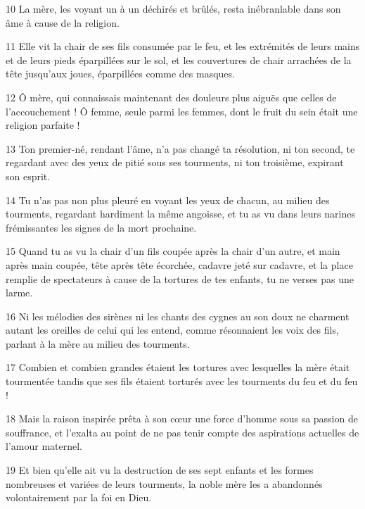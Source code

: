 \par 10 La mère, les voyant un à un déchirés et brûlés, resta inébranlable dans son âme à cause de la religion.

\par 11 Elle vit la chair de ses fils consumée par le feu, et les extrémités de leurs mains et de leurs pieds éparpillées sur le sol, et les couvertures de chair arrachées de la tête jusqu'aux joues, éparpillées comme des masques.

\par 12 Ô mère, qui connaissais maintenant des douleurs plus aiguës que celles de l'accouchement ! Ô femme, seule parmi les femmes, dont le fruit du sein était une religion parfaite !

\par 13 Ton premier-né, rendant l'âme, n'a pas changé ta résolution, ni ton second, te regardant avec des yeux de pitié sous ses tourments, ni ton troisième, expirant son esprit.

\par 14 Tu n'as pas non plus pleuré en voyant les yeux de chacun, au milieu des tourments, regardant hardiment la même angoisse, et tu as vu dans leurs narines frémissantes les signes de la mort prochaine.

\par 15 Quand tu as vu la chair d'un fils coupée après la chair d'un autre, et main après main coupée, tête après tête écorchée, cadavre jeté sur cadavre, et la place remplie de spectateurs à cause de la tortures de tes enfants, tu ne verses pas une larme.

\par 16 Ni les mélodies des sirènes ni les chants des cygnes au son doux ne charment autant les oreilles de celui qui les entend, comme résonnaient les voix des fils, parlant à la mère au milieu des tourments.

\par 17 Combien et combien grandes étaient les tortures avec lesquelles la mère était tourmentée tandis que ses fils étaient torturés avec les tourments du feu et du feu !

\par 18 Mais la raison inspirée prêta à son cœur une force d'homme sous sa passion de souffrance, et l'exalta au point de ne pas tenir compte des aspirations actuelles de l'amour maternel.

\par 19 Et bien qu'elle ait vu la destruction de ses sept enfants et les formes nombreuses et variées de leurs tourments, la noble mère les a abandonnés volontairement par la foi en Dieu.

